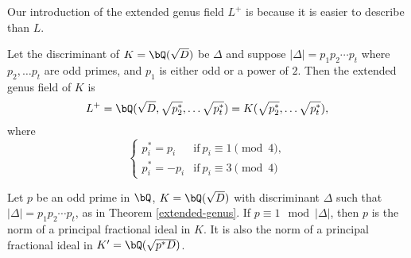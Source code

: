 Our introduction of the extended genus field $L^{+}$ is because it is easier to describe than $L$.

\begin{thm}\label{extended-genus}\cite[Ch VI, \S3, Theorem 3.10]{Janusz}
Let the discriminant of $K = \bQ(\sqrt{D})$ be $\Delta$ and suppose $|\Delta| = p_1 p_2 \cdots p_t$ where $p_2, \ldots p_t$ are odd primes, and $p_1$ is either odd or a power of $2$. Then the extended genus field of $K$ is 
    \[ L^{+} = \bQ(\sqrt{D}, \sqrt{p_2^*}, \ldots \sqrt{p_t^*}) = K(\sqrt{p_2^*}, \ldots \sqrt{p_t^*}), \] 
where 
\[ \begin{cases}
    p_i^* = p_i & \mathrm{if }\ p_i \equiv 1 \pmod 4, \\
    p_i^* = -p_i & \mathrm{if }\ p_i \equiv 3 \pmod 4
\end{cases}\]
\end{thm} 

\vspace{1em}

\begin{cor}\label{p-one-mod-disc}
    Let $p$ be an odd prime in $\bQ$, $K = \bQ(\sqrt{D})$ with discriminant $\Delta$ such that $|\Delta| = p_1 p_2 \cdots p_t$, as in Theorem \ref{extended-genus}. If $p \equiv 1 \mod {|\Delta|}$, then $p$ is the norm of a principal fractional ideal in $K$. 
    It is also the norm of a principal fractional ideal in $K' = \bQ({\sqrt{p^*D}})$.
\end{cor}

